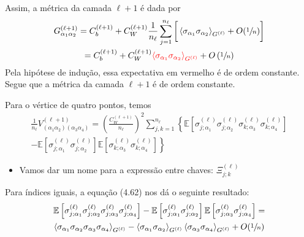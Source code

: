 \documentclass{beamer}
\newcommand{\EE}{\mathbb{E}}
\def\mi#1{{\alpha_{#1}}}
\def\eell{{(\ell)}}
\def\eellum{{(\ell+1)}}
\newcommand{\Gnormal}[3]{{G^{(#1)}_{\mi{#2}\mi{#3}}}}
\newcommand{\Vertice}[5]{V^{(#1)}_{(\mi#2\mi#3)(\mi#4\mi#5)}}
\newcommand{\Expectation}[2]{\left\langle #1 \right\rangle_{#2}}
\begin{document}
\begin{frame}
	Assim, a métrica da camada $\ell+1$ é dada por
	\begin{multline*} 
		\Gnormal{\ell+1}12 = C_b^\eellum + C_W^\eellum\frac{1}{n_\ell}\sum_{j=1}^{n_\ell} \bigg[\Expectation{\sigma_\mi1\sigma_\mi2}{G^\eell} + O(\sfrac{1}{n}) \bigg] \\
		= C_b^\eellum + C_W^\eellum{\color{red}\Expectation{\sigma_\mi1\sigma_\mi2}{G^\eell} } + O\left(\sfrac{1}{n}\right)
	\end{multline*}
	Pela hipótese de indução, essa expectativa em vermelho é de ordem constante. Segue que a métrica da camada $\ell+1$ é de ordem constante.
\end{frame}

\begin{frame}
	Para o vértice de quatro pontos, temos
	{\small
	\begin{multline*}
		\frac{1}{n_\ell}\Vertice{\ell+1}1234 =  \left(\frac{C_W^\eellum}{n_\ell}\right)^2 \sum_{j,k=1}^{n_\ell}  \left\{ \EE\left[\sigma_{j;\mi1}^\eell\sigma_{j;\mi2}^\eell \sigma_{k;\mi3}^\eell\sigma_{k;\mi4}^\eell\right] \right. \\
		\left. - \EE\left[\sigma_{j;\mi1}^\eell\sigma_{j;\mi2}^\eell\right]\EE\left[\sigma_{k;\mi3}^\eell\sigma_{k;\mi4}^\eell\right]\right\}
	\end{multline*}
	} 
	\begin{itemize}
		\item Vamos dar um nome para a expressão entre chaves:  $\Xi_{j;k}^\eell$
	\end{itemize}
\end{frame}

\begin{frame}
	Para índices iguais, a equação (4.62) nos dá o seguinte resultado:
	{
\begin{multline*}
	\EE\left[\sigma_{j;\mi1}^\eell\sigma_{j;\mi2}^\eell \sigma_{j;\mi3}^\eell\sigma_{j;\mi4}^\eell\right] - \EE\left[\sigma_{j;\mi1}^\eell\sigma_{j;\mi2}^\eell\right]\EE\left[\sigma_{j;\mi3}^\eell\sigma_{j;\mi4}^\eell\right] = \\
	\Expectation{\sigma_\mi1\sigma_\mi2\sigma_\mi3\sigma_\mi4}{G^\eell} - \Expectation{\sigma_\mi1\sigma_\mi2}{G^\eell}  \Expectation{\sigma_\mi3\sigma_\mi4}{G^\eell}  +  O(\sfrac{1}{n})
\end{multline*}
	}
\end{frame}
\end{document}
